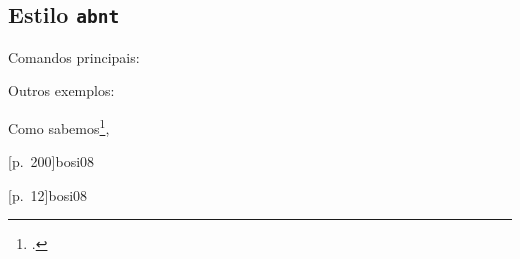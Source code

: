 \documentclass[a4paper]{article}
\begin{document}
\subsection{Estilo \texttt{abnt}}%

Comandos principais:

\begin{example}
\cite{amaral15}
\end{example}

\begin{example}
\textcite{bosi08}
\end{example}

\begin{example}
\end{example}

\begin{example}
\cites{moretti09}{mann09}{amaral15}
\end{example}

\begin{example}
\textcites{moretti09}{mann09}{amaral15}
\end{example}

Outros exemplos:

\begin{example}
Como sabemos\footcite[Cf., e.g.,][]{assis08},
\end{example}

\begin{example}
\end{example}

\begin{example}
\citeauthor{bosi08}
\end{example}

\begin{example}
\citeyear{bosi08}
\end{example}

\begin{example}
\cites{mann09}{moretti09:1, moretti09}
\end{example}

\begin{example}
[p.~200]{bosi08}
\end{example}

\begin{example}
[p.~12]{bosi08}
\end{example}

\begin{example}
\end{example}
\end{document}
